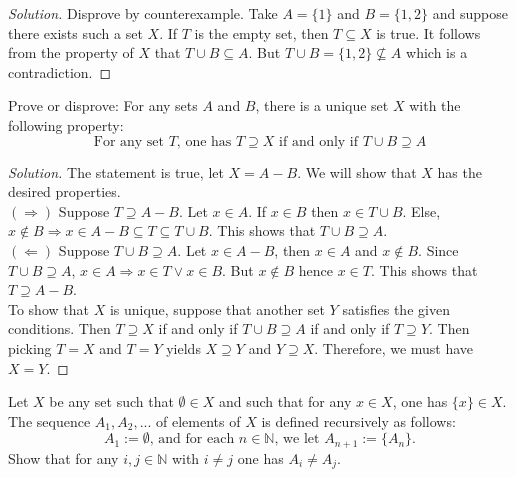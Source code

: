 \documentclass[12pt]{article}
\newenvironment{problem}[2][Problem]{\begin{trivlist}
\item[\hskip \labelsep {\bfseries #1}\hskip \labelsep {\bfseries #2.}]}{\end{trivlist}}
\begin{document}
\begin{proof}[Solution] Disprove by counterexample. Take $A = \{1\}$ and $B = \{1, 2\}$ and suppose there exists such a set $X$. If $T$ is the empty set, then $T \subseteq X$ is true. It follows from the property of $X$ that $T \cup B \subseteq A$. But $T \cup B = \{1, 2\} \not\subseteq A$ which is a contradiction.
\end{proof}

\newpage

\begin{problem}{2}[10 points] Prove or disprove: For any sets $A$ and $B$, there is a unique set $X$ with the following property:
\[\text{For any set }T\text{,  one has  } T\supseteq X \text{   if and only if  } T\cup B \supseteq A\]

\end{problem}

\begin{proof}[Solution] The statement is true, let $X = A - B$. We will show that $X$ has the desired properties.
\\

$(\Rightarrow)$ Suppose $T \supseteq A - B$. Let $x \in A$. If $x \in B$ then $x \in T \cup B$. Else, $x \notin B \Rightarrow x \in A - B \subseteq T \subseteq T \cup B$. This shows that $T \cup B \supseteq A$. 
\\

$(\Leftarrow)$ Suppose $T \cup B \supseteq A$. Let $x \in A - B$, then $x \in A $ and $x \notin B$. Since $T \cup B \supseteq A$, $x \in A \Rightarrow x \in T \lor x \in B$. But $x \notin B$ hence $x \in T$. This shows that $T \supseteq A - B$.
\\

To show that $X$ is unique, suppose that another set $Y$ satisfies the given conditions. Then $T \supseteq X$ if and only if $T \cup B \supseteq A$ if and only if $T \supseteq Y$. Then picking $T = X$ and $T = Y$ yields $X \supseteq Y$ and $Y \supseteq X$. Therefore, we must have $X = Y$.
\end{proof}

\newpage

\begin{problem}{3}[10 points]
Let $X$ be any set such that $\emptyset \in X$ and such that for any $x \in X$, one has $\{x\} \in X$. The sequence $A_1, A_2, ...$ of elements of $X$ is defined recursively as follows:
\[A_1 := \emptyset \text{, and for each } n \in \mathbb{N} \text{, we let } A_{n+1} := \{A_n \}. \]
Show that for any $i, j \in \mathbb{N}$ with $ i \neq j$ one has $A_i \neq A_j$.
\end{problem}
\end{document}
